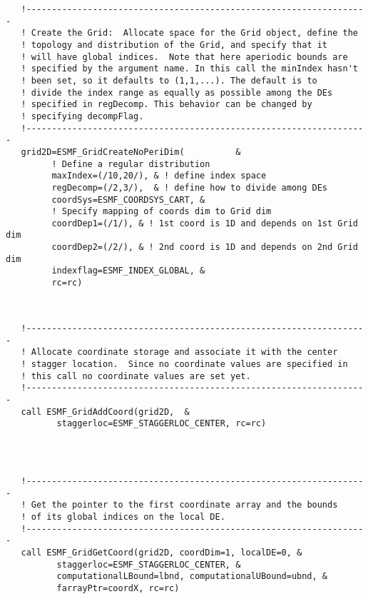 
 \begin{verbatim}
   !-------------------------------------------------------------------
   ! Create the Grid:  Allocate space for the Grid object, define the
   ! topology and distribution of the Grid, and specify that it
   ! will have global indices.  Note that here aperiodic bounds are
   ! specified by the argument name. In this call the minIndex hasn't
   ! been set, so it defaults to (1,1,...). The default is to
   ! divide the index range as equally as possible among the DEs
   ! specified in regDecomp. This behavior can be changed by
   ! specifying decompFlag.
   !-------------------------------------------------------------------
   grid2D=ESMF_GridCreateNoPeriDim(          &
         ! Define a regular distribution
         maxIndex=(/10,20/), & ! define index space
         regDecomp=(/2,3/),  & ! define how to divide among DEs
         coordSys=ESMF_COORDSYS_CART, &
         ! Specify mapping of coords dim to Grid dim
         coordDep1=(/1/), & ! 1st coord is 1D and depends on 1st Grid dim
         coordDep2=(/2/), & ! 2nd coord is 1D and depends on 2nd Grid dim
         indexflag=ESMF_INDEX_GLOBAL, &
         rc=rc)
 
\end{verbatim}
 

 \begin{verbatim}

   !-------------------------------------------------------------------
   ! Allocate coordinate storage and associate it with the center
   ! stagger location.  Since no coordinate values are specified in
   ! this call no coordinate values are set yet.
   !-------------------------------------------------------------------
   call ESMF_GridAddCoord(grid2D,  &
          staggerloc=ESMF_STAGGERLOC_CENTER, rc=rc)
 
\end{verbatim}
 

 \begin{verbatim}


   !-------------------------------------------------------------------
   ! Get the pointer to the first coordinate array and the bounds
   ! of its global indices on the local DE.
   !-------------------------------------------------------------------
   call ESMF_GridGetCoord(grid2D, coordDim=1, localDE=0, &
          staggerloc=ESMF_STAGGERLOC_CENTER, &
          computationalLBound=lbnd, computationalUBound=ubnd, &
          farrayPtr=coordX, rc=rc)
 
\end{verbatim}
 
